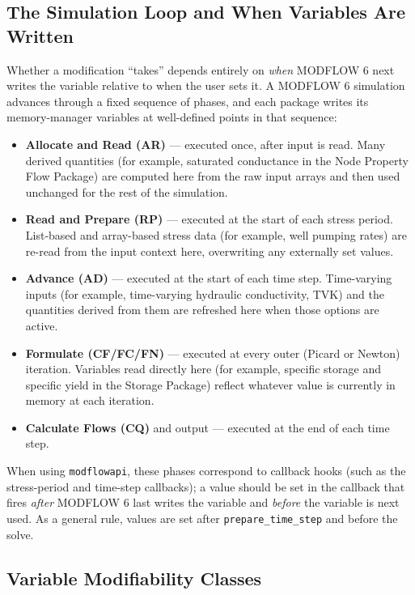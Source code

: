 \subsection{The Simulation Loop and When Variables Are Written}

Whether a modification ``takes'' depends entirely on \emph{when} MODFLOW 6 next
writes the variable relative to when the user sets it. A MODFLOW 6 simulation
advances through a fixed sequence of phases, and each package writes its
memory-manager variables at well-defined points in that sequence:

\begin{itemize}
\item \textbf{Allocate and Read (AR)} --- executed once, after input is read.
Many derived quantities (for example, saturated conductance in the Node
Property Flow Package) are computed here from the raw input arrays and then used
unchanged for the rest of the simulation.
\item \textbf{Read and Prepare (RP)} --- executed at the start of each stress
period. List-based and array-based stress data (for example, well pumping rates)
are re-read from the input context here, overwriting any externally set values.
\item \textbf{Advance (AD)} --- executed at the start of each time step.
Time-varying inputs (for example, time-varying hydraulic conductivity, TVK) and
the quantities derived from them are refreshed here when those options are
active.
\item \textbf{Formulate (CF/FC/FN)} --- executed at every outer (Picard or
Newton) iteration. Variables read directly here (for example, specific storage
and specific yield in the Storage Package) reflect whatever value is currently
in memory at each iteration.
\item \textbf{Calculate Flows (CQ)} and output --- executed at the end of each
time step.
\end{itemize}

\noindent When using \texttt{modflowapi}, these phases correspond to callback
hooks (such as the stress-period and time-step callbacks); a value should be set
in the callback that fires \emph{after} MODFLOW 6 last writes the variable and
\emph{before} the variable is next used. As a general rule, values are set after
\texttt{prepare\_time\_step} and before the solve.

\subsection{Variable Modifiability Classes}


